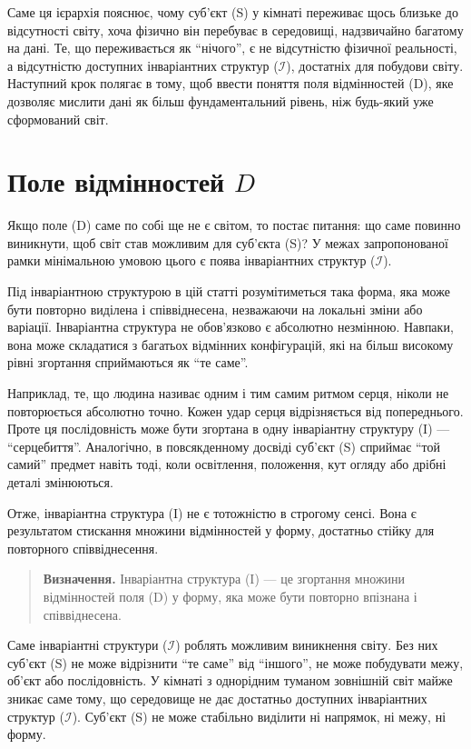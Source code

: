 \documentclass[aps,prd,onecolumn,nofootinbib,superscriptaddress]{revtex4-2}
\begin{document}
Саме ця ієрархія пояснює, чому суб’єкт (S) у кімнаті переживає щось близьке до відсутності світу, хоча фізично він перебуває в середовищі, надзвичайно багатому на дані. Те, що переживається як “нічого”, є не відсутністю фізичної реальності, а відсутністю доступних інваріантних структур ($\mathcal{I}$), достатніх для побудови світу. Наступний крок полягає в тому, щоб ввести поняття поля відмінностей (D), яке дозволяє мислити дані як більш фундаментальний рівень, ніж будь-який уже сформований світ.

\section{Поле відмінностей \texorpdfstring{$D$}{D}}
Якщо поле (D) саме по собі ще не є світом, то постає питання: що саме повинно виникнути, щоб світ став можливим для суб’єкта (S)? У межах запропонованої рамки мінімальною умовою цього є поява інваріантних структур ($\mathcal{I}$).

Під інваріантною структурою в цій статті розумітиметься така форма, яка може бути повторно виділена і співвіднесена, незважаючи на локальні зміни або варіації. Інваріантна структура не обов’язково є абсолютно незмінною. Навпаки, вона може складатися з багатьох відмінних конфігурацій, які на більш високому рівні згортання сприймаються як “те саме”.

Наприклад, те, що людина називає одним і тим самим ритмом серця, ніколи не повторюється абсолютно точно. Кожен удар серця відрізняється від попереднього. Проте ця послідовність може бути згортана в одну інваріантну структуру (I) — “серцебиття”. Аналогічно, в повсякденному досвіді суб’єкт (S) сприймає “той самий” предмет навіть тоді, коли освітлення, положення, кут огляду або дрібні деталі змінюються.

Отже, інваріантна структура (I) не є тотожністю в строгому сенсі. Вона є результатом стискання множини відмінностей у форму, достатньо стійку для повторного співвіднесення.

\begin{quote}
\textbf{Визначення.}
Інваріантна структура (I) — це згортання множини відмінностей поля (D) у форму, яка може бути повторно впізнана і співвіднесена.
\end{quote}


Саме інваріантні структури ($\mathcal{I}$) роблять можливим виникнення світу. Без них суб’єкт (S) не може відрізнити “те саме” від “іншого”, не може побудувати межу, об’єкт або послідовність. У кімнаті з однорідним туманом зовнішній світ майже зникає саме тому, що середовище не дає достатньо доступних інваріантних структур ($\mathcal{I}$). Суб’єкт (S) не може стабільно виділити ні напрямок, ні межу, ні форму.
\end{document}
